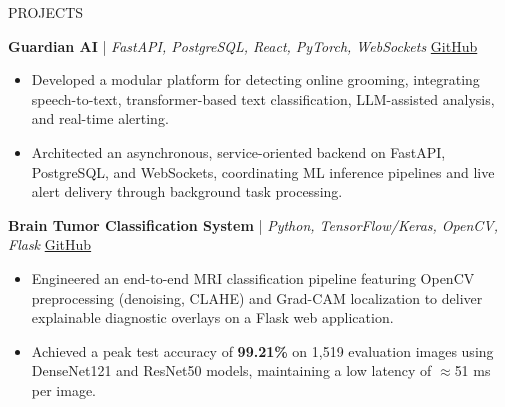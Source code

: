 \documentclass{resume} %
\begin{document}
\vspace{-0.5em}
\begin{rSection}{PROJECTS}


\textbf{Guardian AI} | {\small\textit{FastAPI, PostgreSQL, React, PyTorch, WebSockets}} \hfill
\href{https://github.com/jayadityadev/Guardian-AI}{GitHub} \\
\vspace{-1.5em}

\begin{itemize}
    \itemsep -3pt
    \item Developed a modular platform for detecting online grooming, integrating speech-to-text, transformer-based text classification, LLM-assisted analysis, and real-time alerting.
    \item Architected an asynchronous, service-oriented backend on FastAPI, PostgreSQL, and WebSockets, coordinating ML inference pipelines and live alert delivery through background task processing.
\end{itemize}

\vspace{-0.1em}


\textbf{Brain Tumor Classification System} | {\small\textit{Python, TensorFlow/Keras, OpenCV, Flask}} \hfill
\href{https://github.com/jayadityadev/BrainTumorClassification}{GitHub} \\
\vspace{-1.5em}

\begin{itemize}
    \itemsep -3pt
    \item Engineered an end-to-end MRI classification pipeline featuring OpenCV preprocessing (denoising, CLAHE) and Grad-CAM localization to deliver explainable diagnostic overlays on a Flask web application.
    \item Achieved a peak test accuracy of \textbf{99.21\%} on 1,519 evaluation images using DenseNet121 and ResNet50 models, maintaining a low latency of $\approx$51 ms per image.
\end{itemize}


\end{rSection}
\end{document}
